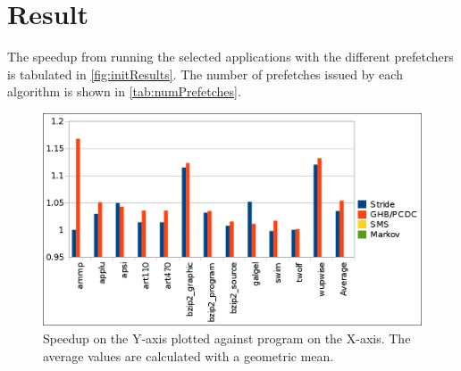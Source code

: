 
\section{Result}
\label{sec:result}

The speedup from running the selected applications with the different
prefetchers is tabulated in \autoref{fig:initResults}. The number of
prefetches issued by each algorithm is shown in
\autoref{tab:numPrefetches}.

\begin{figure}[ht]
  \centering
  \includegraphics[scale=0.25]{figures/init_results.png}
  \caption{\label{fig:initResults} Speedup on the Y-axis plotted
    against program on the X-axis. The average values are calculated
    with a geometric mean.}
\end{figure}


